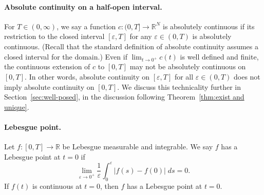 \documentclass{article}
\theoremstyle{definition}
\begin{document}









\paragraph{Absolute continuity on a half-open interval.} 
For $T\in (0,\infty)$, we say a function $c\colon(0,T]\rightarrow\mathbb{R}^N$ is absolutely continuous if its restriction to the closed interval $[\varepsilon,T]$ for any $\varepsilon\in (0,T)$ is absolutely continuous. (Recall that the standard definition of absolute continuity assumes a closed interval for the domain.) Even if $\lim_{t\rightarrow 0^+}c(t)$ is well defined and finite, the continuous extension of $c$ to $[0,T]$ may not be absolutely continuous on $[0,T]$. In other words, absolute continuity on $[\varepsilon,T]$ for all $\varepsilon\in (0,T)$ does not imply absolute continuity on $[0,T]$. We discuss this technicality further in Section~\ref{sec:well-posed}, in the discussion following Theorem~\ref{thm:exist and unique}.

\paragraph{Lebesgue point.}
Let $f\colon [0,T]\rightarrow\mathbb{R}$ be Lebesgue measurable and integrable. 
We say $f$ has a Lebesgue point at $t=0$ if
\[
\lim_{\varepsilon\rightarrow 0^+}\frac{1}{\varepsilon}\int^\varepsilon_0|f(s)-f(0)|\;ds=0.
\]
If $f(t)$ is continuous at $t=0$, then $f$ has a Lebesgue point at $t=0$.
\end{document}
